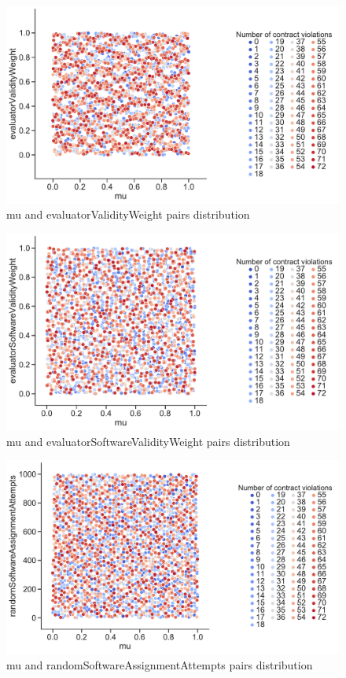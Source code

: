 \begin{figure}
	\centering
	\includegraphics[width=\textwidth]{images/PairsDistr/mu_evaluatorValidityWeight.pdf}
	\caption[mu and evaluatorValidityWeight pairs distribution]{mu and evaluatorValidityWeight pairs distribution}
	\label{fig:mu_evaluatorValidityWeight_pair}
\end{figure}
\begin{figure}
	\centering
	\includegraphics[width=\textwidth]{images/PairsDistr/mu_evaluatorSoftwareValidityWeight.pdf}
	\caption[mu and evaluatorSoftwareValidityWeight pairs distribution]{mu and evaluatorSoftwareValidityWeight pairs distribution}
	\label{fig:mu_evaluatorSoftwareValidityWeight_pair}
\end{figure}
\begin{figure}
	\centering
	\includegraphics[width=\textwidth]{images/PairsDistr/mu_randomSoftwareAssignmentAttempts.pdf}
	\caption[mu and randomSoftwareAssignmentAttempts pairs distribution]{mu and randomSoftwareAssignmentAttempts pairs distribution}
	\label{fig:mu_randomSoftwareAssignmentAttempts_pair}
\end{figure}
